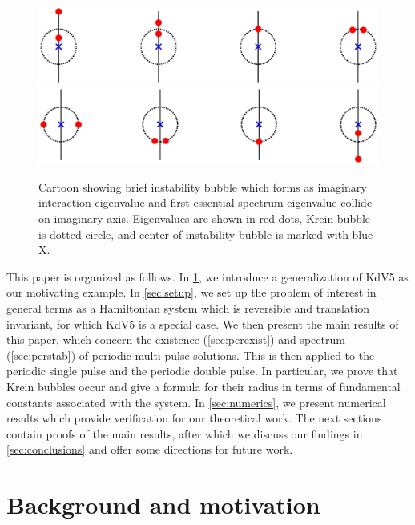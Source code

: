 \documentclass[12pt]{elsarticle}
\theoremstyle{plain}
\theoremstyle{definition}
\theoremstyle{remark}
\numberwithin{theorem}{section}
\numberwithin{equation}{section}
\begin{document}
\begin{figure}
\begin{center}
\includegraphics[width=15cm]{images/KreinBubbleTop.eps}
\includegraphics[width=15cm]{images/KreinBubbleBottom.eps}
\end{center}
\caption{Cartoon showing brief instability bubble which forms as imaginary interaction eigenvalue and first essential spectrum eigenvalue collide on imaginary axis. Eigenvalues are shown in red dots, Krein bubble is dotted circle, and center of instability bubble is marked with blue X.}
\label{fig:KreinBubbleCartoon}
\end{figure}

This paper is organized as follows. In \cref{sec:KdV5}, we introduce a generalization of KdV5 as our motivating example. In \cref{sec:setup}, we set up the problem of interest in general terms as a Hamiltonian system which is reversible and translation invariant, for which KdV5 is a special case. We then present the main results of this paper, which concern the existence (\cref{sec:perexist}) and spectrum (\cref{sec:perstab}) of periodic multi-pulse solutions. This is then applied to the periodic single pulse and the periodic double pulse. In particular, we prove that Krein bubbles occur and give a formula for their radius in terms of fundamental constants associated with the system. In \cref{sec:numerics}, we present numerical results which provide verification for our theoretical work. The next sections contain proofs of the main results, after which we discuss our findings in \cref{sec:conclusions} and offer some directions for future work. 

\section{Background and motivation}\label{sec:KdV5}
\end{document}
